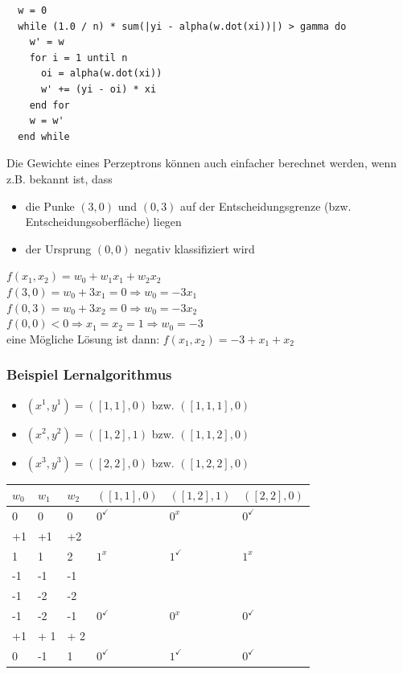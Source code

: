 \documentclass{report}
\begin{document}
\begin{lstlisting}
  w = 0
  while (1.0 / n) * sum(|yi - alpha(w.dot(xi))|) > gamma do
    w' = w
    for i = 1 until n
      oi = alpha(w.dot(xi))
      w' += (yi - oi) * xi
    end for
    w = w'
  end while
\end{lstlisting}

Die Gewichte eines Perzeptrons können auch einfacher berechnet werden, wenn z.B. bekannt ist, dass\\
\vspace*{-1.25em}
\begin{itemize}
  \item die Punke $(3, 0)$ und $(0, 3)$ auf der Entscheidungsgrenze (bzw. Entscheidungsoberfläche) liegen
  \item der Ursprung $(0, 0)$ negativ klassifiziert wird
\end{itemize}

$f(x_1, x_2) = w_0 + w_1x_1 + w_2x_2$\\
$f(3, 0) = w_0 + 3x_1 = 0 \Rightarrow w_0 = -3x_1$\\
$f(0, 3) = w_0 + 3x_2 = 0 \Rightarrow w_0 = -3x_2$\\
$f(0, 0) < 0 \Rightarrow x_1 = x_2 = 1 \Rightarrow w_0 = -3$\\
eine Mögliche Lösung ist dann: $f(x_1, x_2) = -3 + x_1 + x_2$

\subsubsection{Beispiel Lernalgorithmus}
\begin{itemize}
  \item $(x^1, y^1) = ([1, 1], 0)$ bzw. $([1, 1, 1], 0)$
  \item $(x^2, y^2) = ([1, 2], 1)$ bzw. $([1, 1, 2], 0)$
  \item $(x^3, y^3) = ([2, 2], 0)$ bzw. $([1, 2, 2], 0)$
\end{itemize}

\begin{tabular}{l|l|l|l|l|l}
  $w_0$ & $w_1$ & $w_2$ & $([1, 1], 0)$ & $([1, 2], 1)$ & $([2, 2], 0)$\\
  \hline
  0 & 0 & 0 & $0^{\checkmark}$ & $0^{x}$ & $0^{\checkmark}$\\
  +1 & +1 & +2 & & &\\
  \hline
  1 & 1 & 2 & $1^x$ & $1^{\checkmark}$ & $1^x$\\
  -1 & -1 & -1 & & &\\
  -1 & -2 & -2 & & &\\
  \hline
  -1 & -2 & -1 & $0^{\checkmark}$ & $0^x$ & $0^{\checkmark}$\\
  +1 & + 1 & + 2 & & &\\
  \hline
  0 & -1 & 1 & $0^{\checkmark}$ & $1^{\checkmark}$ & $0^{\checkmark}$
\end{tabular}
\end{document}
